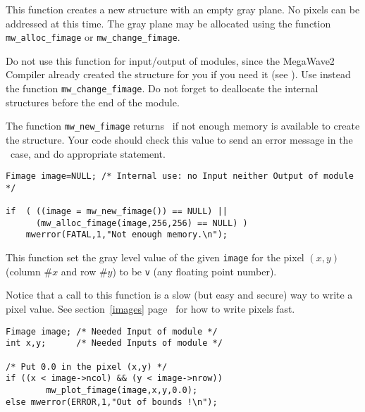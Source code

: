 \newpage %
\Description
This function creates a new \fimage structure with an empty gray plane.
No pixels can be addressed at this time.
The gray plane may be allocated using the function \verb+mw_alloc_fimage+ or
\verb+mw_change_fimage+.

Do not use this function for input/output of modules, since the MegaWave2
Compiler already created the structure for you if you need it (see \volI). Use instead the function \verb+mw_change_fimage+.
Do not forget to deallocate the internal structures before the end
of the module.

The function \verb+mw_new_fimage+ returns \Null\ if not enough memory is available to create the structure. Your code should check this value to send an
error message in the \Null\ case, and do appropriate statement.

\Next
\Example
\begin{verbatim}
Fimage image=NULL; /* Internal use: no Input neither Output of module */

if  ( ((image = mw_new_fimage()) == NULL) ||
      (mw_alloc_fimage(image,256,256) == NULL) )
    mwerror(FATAL,1,"Not enough memory.\n");
\end{verbatim}

\newpage %

\Description
This function set the gray level value of the given \verb+image+ for the pixel $(x,y)$ (column $\# x$ and row $\# y$) to be \verb+v+  (any floating point number).

Notice that a call to this function is a slow (but easy and secure) way to 
write a pixel value.
See section~\ref{images} page~\pageref{images} for how to write pixels fast.

\Next
\Example
\begin{verbatim}
Fimage image; /* Needed Input of module */
int x,y;      /* Needed Inputs of module */

/* Put 0.0 in the pixel (x,y) */
if ((x < image->ncol) && (y < image->nrow))
        mw_plot_fimage(image,x,y,0.0);
else mwerror(ERROR,1,"Out of bounds !\n");

\end{verbatim}
\newpage %

